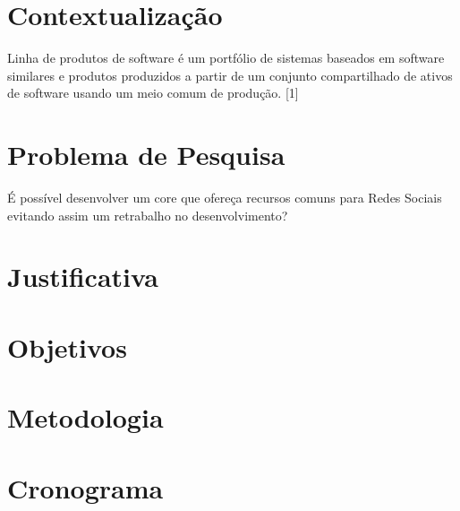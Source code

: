 









\frenchspacing 
\imprimircapa

\textual

\section*{Contextualização}

Linha de produtos de software é um portfólio de sistemas baseados em software similares e produtos produzidos a partir de um conjunto compartilhado de ativos de software usando um meio comum de produção. [1]

\section*{Problema de Pesquisa}

É possível desenvolver um core que ofereça recursos comuns para Redes Sociais evitando assim um retrabalho no desenvolvimento?

\section*{Justificativa}

\section*{Objetivos}

\section*{Metodologia}

\section*{Cronograma}

\postextual

 



